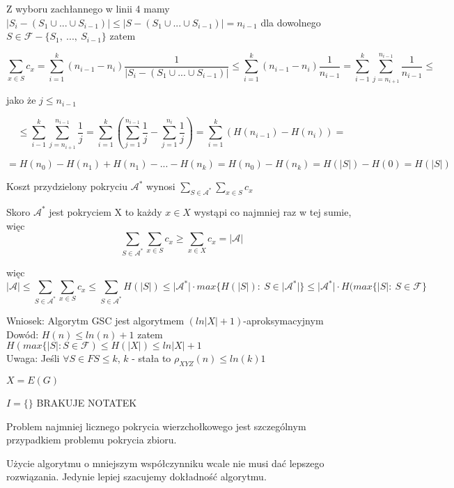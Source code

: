 Z wyboru zachłannego w linii 4 mamy $\vert S_i - (S_1 \cup ... \cup S_{i-1})\vert \leq \vert S - (S_1 \cup ... \cup S_{i-1})\vert = n_{i-1}$ dla dowolnego $S \in \mathcal{F} - \lbrace S_1,\ ...,\ S_{i-1}\rbrace$ zatem

$$\sum_{x\in S} c_x = \sum_{i=1}^{k} (n_{i-1}-n_i)\frac{1}{\vert S_i - (S_1 \cup ... \cup S_{i-1})\vert} \leq \sum_{i=1}^{k}(n_{i-1}- n_i)\frac{1}{n_{i-1}}=\sum_{i-1}^{k}\sum_{j=n_{i+1}}^{n_{i-1}}\frac{1}{n_{i-1}} \leq$$

jako że $j\leq n_{i-1}$

$$\leq \sum_{i-1}^{k}\sum_{j=n_{i+1}}^{n_{i-1}}\frac{1}{j}=\sum_{i=1}^{k}(\sum_{j=1}^{n_{i-1}} \frac{1}{j}- \sum_{j=1}^{n_i} \frac{1}{j}) = \sum_{i=1}^{k} (H(n_{i-1}) - H(n_i)) = $$

$$ = H(n_0) - H(n_1) + H(n_1) - ... - H(n_k) = H(n_0) - H(n_k) = H(\vert S\vert ) - H(0) = H(\vert S\vert )$$

Koszt przydzielony pokryciu $\mathcal{A}^{\ast}$ wynosi $\sum_{S\in \mathcal{A}^{\ast}}\sum_{x\in S}c_x$

Skoro $\mathcal{A}^{\ast}$ jest pokryciem X to każdy $x \in X$ wystąpi co najmniej raz w tej sumie, więc
$$\sum_{S\in \mathcal{A}^{\ast}}\sum_{x\in S}c_x \geq \sum_{x\in X}c_x = \vert \mathcal{A}\vert$$

więc $$\vert \mathcal{A}\vert \leq \sum_{S\in \mathcal{A}^{\ast}}\sum_{x\in S}c_x \leq \sum_{S\in \mathcal{A}^{\ast}}H(\vert S\vert )\leq \vert \mathcal{A}^{\ast}\vert \cdot max\lbrace H(\vert S\vert):\ S\in \vert \mathcal{A}^{\ast}\vert\rbrace \leq\vert\mathcal{A}^{\ast}\vert \cdot H(max\lbrace\vert S\vert :\ S\in \mathcal{F}\rbrace$$

Wniosek: Algorytm GSC jest algorytmem $(ln\vert X \vert + 1)$-aproksymacyjnym\\
Dowód: 
$H(n)\leq ln(n)+1$
zatem
$H(max\lbrace\vert S\vert :S\in \mathcal{F})\leq H(\vert X\vert )\leq ln\vert X\vert + 1$\\

Uwaga: Jeśli $\forall{S \in F} S \leq k$, $k$ - stała to $\rho_{XYZ}(n) \leq ln(k) 1$

$X = E(G)$

$I=\{ \}$   BRAKUJE NOTATEK

Problem najmniej licznego pokrycia wierzchołkowego jest szczególnym przypadkiem problemu pokrycia zbioru.

Użycie algorytmu o mniejszym współczynniku wcale nie musi dać lepszego rozwiązania. Jedynie lepiej szacujemy dokładność algorytmu.